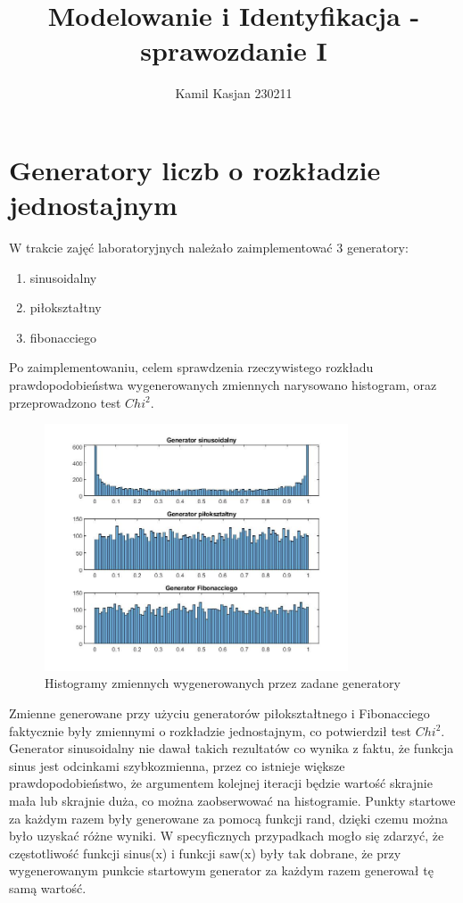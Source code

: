 \documentclass[a4paper,onecolumn,oneside,12pt,extrafontsizes]{article}
\author{Kamil Kasjan 230211}
\title{Modelowanie i Identyfikacja - sprawozdanie I}
\begin{document}
\maketitle

\section{Generatory liczb o rozkładzie jednostajnym}
W trakcie zajęć laboratoryjnych należało zaimplementować 3 generatory:
\begin{enumerate}
	\item{sinusoidalny}
	\item{piłokształtny}
	\item{fibonacciego}
\end{enumerate}
Po zaimplementowaniu, celem sprawdzenia rzeczywistego rozkładu prawdopodobieństwa wygenerowanych zmiennych narysowano histogram, oraz przeprowadzono test $Chi^2$. 
\begin{figure}[!htb]
	\centering
	\caption{Histogramy zmiennych wygenerowanych przez zadane generatory}
	\includegraphics[width=9cm]{fig1.jpg}
\end{figure}
\newpage

Zmienne generowane przy użyciu generatorów piłokształtnego i Fibonacciego faktycznie były zmiennymi o rozkładzie jednostajnym, co potwierdził test $Chi^2$. Generator sinusoidalny nie dawał takich rezultatów co wynika z faktu, że funkcja sinus jest odcinkami szybkozmienna, przez co istnieje większe prawdopodobieństwo, że argumentem kolejnej iteracji będzie wartość skrajnie mała lub skrajnie duża, co można zaobserwować na histogramie. Punkty startowe za każdym razem były generowane za pomocą funkcji rand, dzięki czemu można było uzyskać różne wyniki. W specyficznych przypadkach mogło się zdarzyć, że częstotliwość funkcji sinus(x) i funkcji saw(x) były tak dobrane, że przy wygenerowanym punkcie startowym generator za każdym razem generował tę samą wartość.
\end{document}
